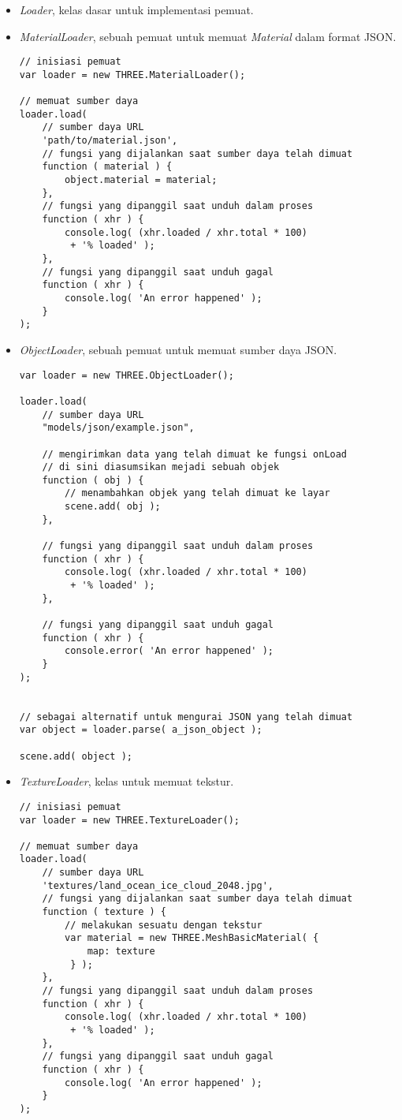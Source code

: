 \begin{itemize}
\begin{itemize}
	\item {\it Loader}, kelas dasar untuk implementasi pemuat.
	
	\item {\it MaterialLoader}, sebuah pemuat untuk memuat {\it Material} dalam format JSON.
	
\begin{lstlisting}
// inisiasi pemuat
var loader = new THREE.MaterialLoader();

// memuat sumber daya
loader.load(
	// sumber daya URL
	'path/to/material.json',
	// fungsi yang dijalankan saat sumber daya telah dimuat
	function ( material ) {
		object.material = material;
	},
	// fungsi yang dipanggil saat unduh dalam proses
	function ( xhr ) {
		console.log( (xhr.loaded / xhr.total * 100)
		 + '% loaded' );
	},
	// fungsi yang dipanggil saat unduh gagal
	function ( xhr ) {
		console.log( 'An error happened' );
	}
);
\end{lstlisting}

	\item {\it ObjectLoader}, sebuah pemuat untuk memuat sumber daya JSON.
	
\begin{lstlisting}
var loader = new THREE.ObjectLoader();

loader.load(
    // sumber daya URL
    "models/json/example.json",

    // mengirimkan data yang telah dimuat ke fungsi onLoad
    // di sini diasumsikan mejadi sebuah objek
    function ( obj ) {
		// menambahkan objek yang telah dimuat ke layar
        scene.add( obj );
    },

    // fungsi yang dipanggil saat unduh dalam proses
    function ( xhr ) {
        console.log( (xhr.loaded / xhr.total * 100)
         + '% loaded' );
    },

    // fungsi yang dipanggil saat unduh gagal
    function ( xhr ) {
        console.error( 'An error happened' );
    }
);


// sebagai alternatif untuk mengurai JSON yang telah dimuat
var object = loader.parse( a_json_object );

scene.add( object );
\end{lstlisting}

	\item {\it TextureLoader}, kelas untuk memuat tekstur.
	
\begin{lstlisting}
// inisiasi pemuat
var loader = new THREE.TextureLoader();

// memuat sumber daya
loader.load(
	// sumber daya URL
	'textures/land_ocean_ice_cloud_2048.jpg',
	// fungsi yang dijalankan saat sumber daya telah dimuat
	function ( texture ) {
		// melakukan sesuatu dengan tekstur
		var material = new THREE.MeshBasicMaterial( {
			map: texture
		 } );
	},
	// fungsi yang dipanggil saat unduh dalam proses
	function ( xhr ) {
		console.log( (xhr.loaded / xhr.total * 100)
		 + '% loaded' );
	},
	// fungsi yang dipanggil saat unduh gagal
	function ( xhr ) {
		console.log( 'An error happened' );
	}
);
\end{lstlisting}


\end{itemize}
\end{itemize}
